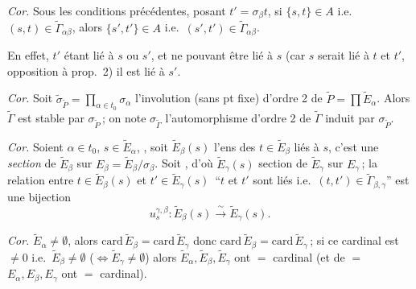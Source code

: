 \documentclass[11pt,a4paper]{article}
\begin{document}
\emph{Cor.} Sous les conditions précédentes, posant $t'=\sigma_{\beta}t$,  si  $\{s,t\}\in A$ i.e.\ $(s,t)\in\widetilde{\Gamma}_{\alpha\beta}$, alors  $\{s',t'\}\in A$ i.e.\ $(s',t')\in\widetilde{\Gamma}_{\alpha\beta}$.

En effet, $t'$ étant lié à $s$ ou $s'$, et ne pouvant être lié à $s$ (car $s$ serait lié à $t$ et $t'$,  opposition à prop.~2) il est lié à $s'$.

\emph{Cor.} Soit $\widetilde{\sigma}_{\widetilde{P}}=\prod_{\alpha\in t_0}\sigma_{\alpha}$ l'involution (sans pt fixe) d'ordre 2 \struck{\ill{}} de $\widetilde{P}=\prod\widetilde{E}_{\alpha}$. Alors $\widetilde{\Gamma}$ est stable par $\sigma_{\widetilde{P}}$\,; on note $\sigma_{\widetilde{\Gamma}}$ l'automorphisme d'ordre 2 de $\widetilde{\Gamma}$ induit par $\sigma_{\widetilde{P}}$.

\emph{Cor.} Soient $\alpha\in t_0$, $s\in\widetilde{E}_{\alpha}$,  , soit $\widetilde{E}_{\beta}(s)$  l'ens des $t\in\widetilde{E}_{\beta}$ liés à $s$, c'est  une \emph{section} de $\widetilde{E}_{\beta}$ sur $E_{\beta}=\widetilde{E}_{\beta}/\sigma_{\beta}$. Soit  , d'où $\widetilde{E}_{\gamma}(s)$ section de $\widetilde{E}_{\gamma}$ sur $E_{\gamma}$\,; la relation entre $t\in\widetilde{E}_{\beta}(s)$ et $t'\in\widetilde{E}_{\gamma}(s)$ \,``$t$ et $t'$ sont liés i.e.\ $(t,t')\in\widetilde{\Gamma}_{\beta,\gamma}$'' est une bijection \struck{\ill{}}
\[
  u_s^{\gamma,\beta}:\widetilde{E}_{\beta}(s)\xrightarrow{\ \sim\ }\widetilde{E}_{\gamma}(s).
\]

\emph{Cor.}   $\widetilde{E}_{\alpha}\neq\emptyset$, alors $\mathrm{card}\,\widetilde{E}_{\beta}=\mathrm{card}\,\widetilde{E}_{\gamma}$ donc $\mathrm{card}\,\widetilde{E}_{\beta}=\mathrm{card}\,\widetilde{E}_{\gamma}$\,; si ce \struck{\ill{}} cardinal est $\neq0$ i.e.\ $\widetilde{E}_{\beta}\neq\emptyset$ ($\Longleftrightarrow\widetilde{E}_{\gamma}\neq\emptyset$) alors $\widetilde{E}_{\alpha},\widetilde{E}_{\beta},\widetilde{E}_{\gamma}$ ont $=$ cardinal (et de $=$ $E_{\alpha},E_{\beta},E_{\gamma}$ ont $=$ cardinal). 
\end{document}
